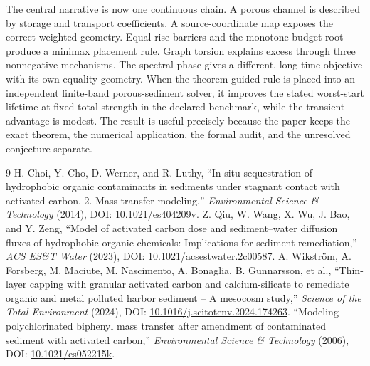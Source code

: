 \documentclass[10pt]{article}
\begin{document}
The central narrative is now one continuous chain. A porous channel is described by storage and transport coefficients. A source-coordinate map exposes the correct weighted geometry. Equal-rise barriers and the monotone budget root produce a minimax placement rule. Graph torsion explains excess through three nonnegative mechanisms. The spectral phase gives a different, long-time objective with its own equality geometry. When the theorem-guided rule is placed into an independent finite-band porous-sediment solver, it improves the stated worst-start lifetime at fixed total strength in the declared benchmark, while the transient advantage is modest. The result is useful precisely because the paper keeps the exact theorem, the numerical application, the formal audit, and the unresolved conjecture separate.

\begin{thebibliography}{9}\footnotesize
{} H. Choi, Y. Cho, D. Werner, and R. Luthy, ``In situ sequestration of hydrophobic organic contaminants in sediments under stagnant contact with activated carbon. 2. Mass transfer modeling,'' \emph{Environmental Science \& Technology} (2014), DOI: \href{https://doi.org/10.1021/es404209v}{10.1021/es404209v}.
 Z. Qiu, W. Wang, X. Wu, J. Bao, and Y. Zeng, ``Model of activated carbon dose and sediment--water diffusion fluxes of hydrophobic organic chemicals: Implications for sediment remediation,'' \emph{ACS ES\&T Water} (2023), DOI: \href{https://doi.org/10.1021/acsestwater.2c00587}{10.1021/acsestwater.2c00587}.
 A. Wikström, A. Forsberg, M. Maciute, M. Nascimento, A. Bonaglia, B. Gunnarsson, et al., ``Thin-layer capping with granular activated carbon and calcium-silicate to remediate organic and metal polluted harbor sediment -- A mesocosm study,'' \emph{Science of the Total Environment} (2024), DOI: \href{https://doi.org/10.1016/j.scitotenv.2024.174263}{10.1016/j.scitotenv.2024.174263}.
 ``Modeling polychlorinated biphenyl mass transfer after amendment of contaminated sediment with activated carbon,'' \emph{Environmental Science \& Technology} (2006), DOI: \href{https://doi.org/10.1021/es052215k}{10.1021/es052215k}.
\end{thebibliography}
\end{document}
